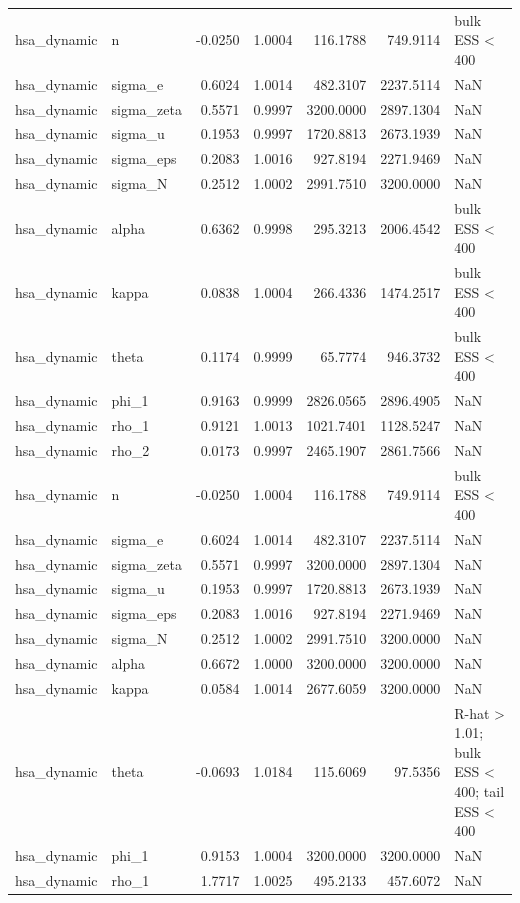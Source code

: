 \begin{tabular}{llrrrrl}
hsa\_dynamic & n & -0.0250 & 1.0004 & 116.1788 & 749.9114 & bulk ESS < 400 \\
hsa\_dynamic & sigma\_e & 0.6024 & 1.0014 & 482.3107 & 2237.5114 & NaN \\
hsa\_dynamic & sigma\_zeta & 0.5571 & 0.9997 & 3200.0000 & 2897.1304 & NaN \\
hsa\_dynamic & sigma\_u & 0.1953 & 0.9997 & 1720.8813 & 2673.1939 & NaN \\
hsa\_dynamic & sigma\_eps & 0.2083 & 1.0016 & 927.8194 & 2271.9469 & NaN \\
hsa\_dynamic & sigma\_N & 0.2512 & 1.0002 & 2991.7510 & 3200.0000 & NaN \\
hsa\_dynamic & alpha & 0.6362 & 0.9998 & 295.3213 & 2006.4542 & bulk ESS < 400 \\
hsa\_dynamic & kappa & 0.0838 & 1.0004 & 266.4336 & 1474.2517 & bulk ESS < 400 \\
hsa\_dynamic & theta & 0.1174 & 0.9999 & 65.7774 & 946.3732 & bulk ESS < 400 \\
hsa\_dynamic & phi\_1 & 0.9163 & 0.9999 & 2826.0565 & 2896.4905 & NaN \\
hsa\_dynamic & rho\_1 & 0.9121 & 1.0013 & 1021.7401 & 1128.5247 & NaN \\
hsa\_dynamic & rho\_2 & 0.0173 & 0.9997 & 2465.1907 & 2861.7566 & NaN \\
hsa\_dynamic & n & -0.0250 & 1.0004 & 116.1788 & 749.9114 & bulk ESS < 400 \\
hsa\_dynamic & sigma\_e & 0.6024 & 1.0014 & 482.3107 & 2237.5114 & NaN \\
hsa\_dynamic & sigma\_zeta & 0.5571 & 0.9997 & 3200.0000 & 2897.1304 & NaN \\
hsa\_dynamic & sigma\_u & 0.1953 & 0.9997 & 1720.8813 & 2673.1939 & NaN \\
hsa\_dynamic & sigma\_eps & 0.2083 & 1.0016 & 927.8194 & 2271.9469 & NaN \\
hsa\_dynamic & sigma\_N & 0.2512 & 1.0002 & 2991.7510 & 3200.0000 & NaN \\
hsa\_dynamic & alpha & 0.6672 & 1.0000 & 3200.0000 & 3200.0000 & NaN \\
hsa\_dynamic & kappa & 0.0584 & 1.0014 & 2677.6059 & 3200.0000 & NaN \\
hsa\_dynamic & theta & -0.0693 & 1.0184 & 115.6069 & 97.5356 & R-hat > 1.01; bulk ESS < 400; tail ESS < 400 \\
hsa\_dynamic & phi\_1 & 0.9153 & 1.0004 & 3200.0000 & 3200.0000 & NaN \\
hsa\_dynamic & rho\_1 & 1.7717 & 1.0025 & 495.2133 & 457.6072 & NaN \\

\end{tabular}
